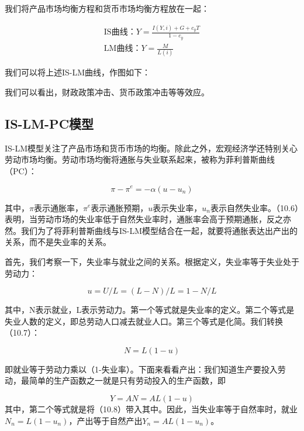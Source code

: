 \documentclass[cn,12pt,math=newtx,citestyle=gb7714-2015,bibstyle=gb7714-2015]{elegantbook}
\begin{document}
	我们将产品市场均衡方程和货币市场均衡方程放在一起：
	
	\begin{equation}
		\begin{array}{l}
			\text{IS曲线：}   Y = \frac{I(Y,i)+G+c_y T}{1-c_y}\\
			\text{LM曲线：}     Y=\frac{M}{L(i)}
		\end{array}
	\end{equation}
	
	我们可以将上述IS-LM曲线，作图如下：
	
	
	我们可以看出，财政政策冲击、货币政策冲击等等效应。
	
	\subsection{IS-LM-PC模型}
	
	IS-LM模型关注了产品市场和货币市场的均衡。除此之外，宏观经济学还特别关心劳动市场均衡。劳动市场均衡将通胀与失业联系起来，被称为菲利普斯曲线（PC）：
	
	\begin{equation}
		\pi -\pi^e = -\alpha(u-u_n)
	\end{equation}

其中，$\pi$表示通胀率，$\pi^e$表示通胀预期，$u$表示失业率，$u_n$表示自然失业率。（10.6）表明，当劳动市场的失业率低于自然失业率时，通胀率会高于预期通胀，反之亦然。我们为了将菲利普斯曲线与IS-LM模型结合在一起，就要将通胀表达出产出的关系，而不是失业率的关系。

首先，我们考察一下，失业率与就业之间的关系。根据定义，失业率等于失业处于劳动力：

\begin{equation}
	u = U / L = (L - N) / L = 1-N/L
\end{equation}
	
	其中，N表示就业，L表示劳动力。第一个等式就是失业率的定义。第二个等式是失业人数的定义，即总劳动人口减去就业人口。第三个等式是化简。我们转换（10.7）：
	
	\begin{equation}
		N = L(1-u)
	\end{equation}
	
	即就业等于劳动力乘以（1-失业率）。下面来看看产出：我们知道生产要投入劳动，最简单的生产函数之一就是只有劳动投入的生产函数，即
	
	\begin{equation}
		Y=AN =AL(1-u)
	\end{equation}
	其中，第二个等式就是将（10.8）带入其中。因此，当失业率等于自然率时，就业$N_n=L(1-u_n)$，产出等于自然产出$Y_n =AL(1-u_n)$。
	
\end{document}
